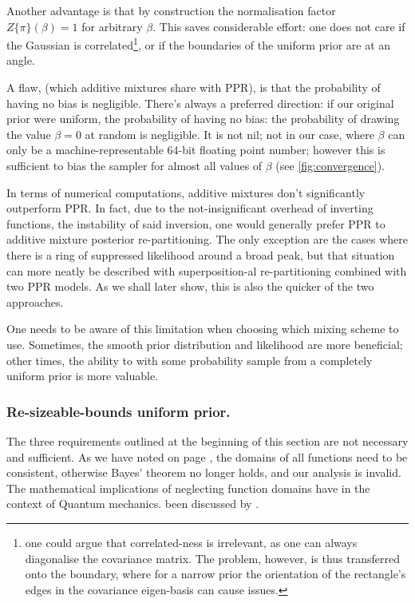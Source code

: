 \documentclass[usenatbib]{mnras}
\begin{document}
Another advantage is that by construction the normalisation factor
\(Z \{ \pi\}(\beta) = 1\) for arbitrary \(\beta\). This saves
considerable effort: one does not care if the Gaussian is
correlated\footnote{one could argue that correlated-ness is irrelevant,
as one can always diagonalise the covariance matrix. The problem,
however, is thus transferred onto the boundary, where for a narrow
prior the orientation of the rectangle's edges in the covariance
eigen-basis can cause issues.}, or if the boundaries of the
uniform prior are at an angle.

A flaw, (which additive mixtures share with PPR), is that the
probability of having no bias is negligible. There's always a
preferred direction: if our original prior were uniform, the
probability of having no bias: the probability of drawing the
value \(\beta=0\) at random is negligible. It is not nil; not in our
case, where \(\beta\) can only be a machine-representable 64-bit
floating point number; however this is sufficient to bias the
sampler for almost all values of \(\beta\) (see
\autoref{fig:convergence}).

In terms of numerical computations, additive mixtures don't
significantly outperform PPR. In fact, due to the
not-insignificant overhead of inverting functions, the instability
of said inversion, one would generally prefer PPR to additive
mixture posterior re-partitioning. The only exception are the
cases where there is a ring of suppressed likelihood around a
broad peak, but that situation can more neatly be described with
superposition-al re-partitioning combined with two PPR models. As
we shall later show, this is also the quicker of the two
approaches.

One needs to be aware of this limitation when choosing which
mixing scheme to use. Sometimes, the smooth prior distribution and
likelihood are more beneficial; other times, the ability to with
some probability sample from a completely uniform prior is more
valuable. 



\subsubsection{Re-sizeable-bounds uniform prior.}
\label{sec:org2641cb8}

The three requirements outlined at the beginning of this section
are not necessary and sufficient. As we have noted on page
\pageref{domain-discussion}, the domains of all functions need to be
consistent, otherwise Bayes' theorem no longer holds, and our
analysis is invalid. The mathematical implications of neglecting
function domains have in the context of Quantum mechanics. been
discussed by \cite{Gieres_2000}.
\end{document}
